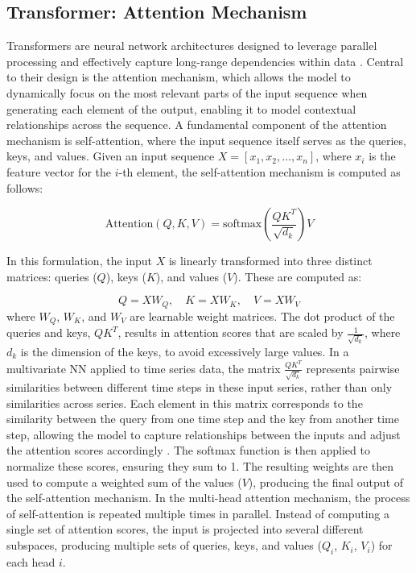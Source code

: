 \documentclass[acmsmall]{acmart}
\begin{document}
\subsection{Transformer: Attention Mechanism}


Transformers are neural network architectures designed to leverage parallel processing and effectively capture long-range dependencies within data \cite{vaswani2017attention}. Central to their design is the attention mechanism, which allows the model to dynamically focus on the most relevant parts of the input sequence when generating each element of the output, enabling it to model contextual relationships across the sequence.  A fundamental component of the attention mechanism is self-attention, where the input sequence itself serves as the queries, keys, and values. Given an input sequence $X = [x_1, x_2, \dots, x_n]$, where $x_i$ is the feature vector for the $i$-th element, the self-attention mechanism is computed as follows:

\begin{equation}
    \text{Attention}(Q, K, V) = \text{softmax}\left(\frac{QK^T}{\sqrt{d_k}}\right)V
\end{equation}

In this formulation, the input $X$ is linearly transformed into three distinct matrices: queries ($Q$), keys ($K$), and values ($V$). These are computed as:

\begin{equation}
    Q = XW_Q, \quad K = XW_K, \quad V = XW_V
\end{equation}
where $W_Q$, $W_K$, and $W_V$ are learnable weight matrices. The dot product of the queries and keys, $QK^T$, results in attention scores that are scaled by $\frac{1}{\sqrt{d_k}}$, where $d_k$ is the dimension of the keys, to avoid excessively large values. In a multivariate NN applied to time series data, the matrix $\frac{QK^T}{\sqrt{d_k}}$ represents {\color{black}pairwise similarities between different time steps in these input series, rather than only similarities across series}. Each element in this matrix corresponds to the similarity between the query from one {\color{black} time step} and the key from another {\color{black} time step}, allowing the model to capture relationships between the inputs and adjust the attention scores accordingly \cite{lin2017structured}. The softmax function is then applied to normalize these scores, ensuring they sum to 1. The resulting weights are then used to compute a weighted sum of the values ($V$), producing the final output of the self-attention mechanism.
In the multi-head attention mechanism, the process of self-attention is repeated multiple times in parallel. Instead of computing a single set of attention scores, the input is projected into several different subspaces, producing multiple sets of queries, keys, and values ($Q_i$, $K_i$, $V_i$) for each head $i$.
\end{document}
